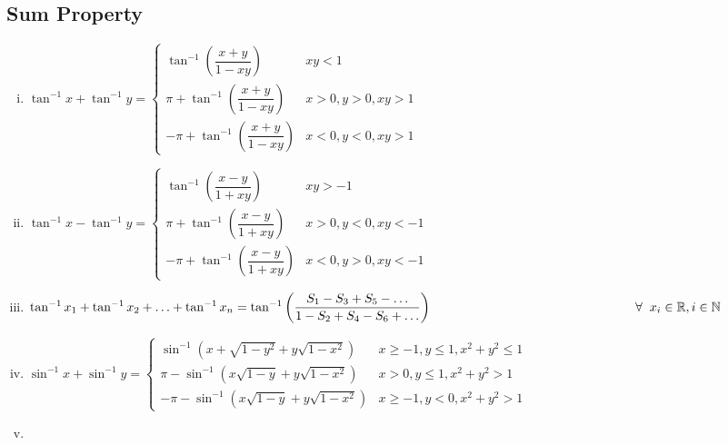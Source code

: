 \documentclass{article}
\begin{document}
\subsection{Sum Property}
\begin{enumerate}[i.]
    \item $\tan^{-1}x+\tan^{-1}y=\begin{cases}
        \tan^{-1}\left(\dfrac{x+y}{1-xy}\right) & xy<1 \\
        \pi + \tan^{-1}\left(\dfrac{x+y}{1-xy}\right) & x>0, y>0, xy>1 \\
        -\pi + \tan^{-1}\left(\dfrac{x+y}{1-xy}\right) & x<0, y<0, xy>1
    \end{cases}$
    \item $\tan^{-1}x-\tan^{-1}y=\begin{cases}
        \tan^{-1}\left(\dfrac{x-y}{1+xy}\right) & xy>-1 \\
        \pi +\tan^{-1}\left(\dfrac{x-y}{1+xy}\right) & x>0, y<0, xy<-1 \\
        -\pi +\tan^{-1}\left(\dfrac{x-y}{1+xy}\right) & x<0, y>0, xy<-1
    \end{cases}$
    \item $\tan^{-1}x_{1}+\tan^{-1}x_{2}+ \ldots + \tan^{-1}x_{n}=\tan^{-1}\left(\dfrac{S_{1}-S_{3}+S_{5}- \ldots}{1-S_{2}+S_{4}-S_{6}+\ldots}\right) \hfill \\ \hphantom{2cm} \hspace{5cm} \forall \hspace{2mm} x_{i} \in \mathbb{R}, i \in \mathbb{N}$
    \item $\sin^{-1}x+\sin^{-1}y=\begin{cases}
        \sin^{-1}\left(x+\sqrt{1-y^2}+y\sqrt{1-x^2}\right) & x\ge -1, y \le 1, x^2+y^2 \le 1\\
        \pi - \sin^{-1}\left(x\sqrt{1-y}+y\sqrt{1-x^2}\right) & x > 0, y \le 1, x^2+y^2>1 \\
        -\pi - \sin^{-1}\left(x\sqrt{1-y}+y\sqrt{1-x^2}\right) & x \ge -1, y < 0, x^2+y^2 >1
    \end{cases}$
    \item 
\end{enumerate}
\end{document}
